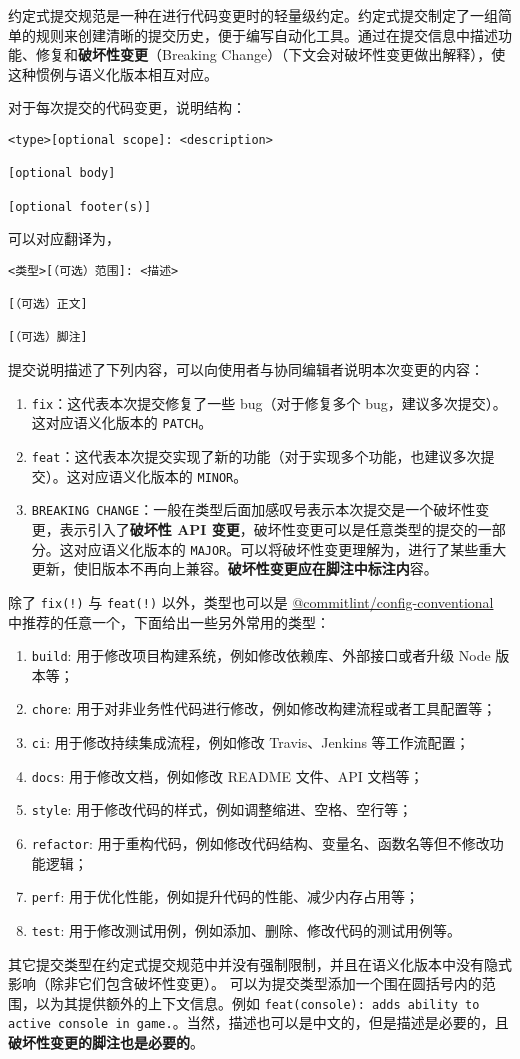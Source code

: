 
\begin{issues}
\issueDraft
\issueTODO
\end{issues}

约定式提交规范是一种在进行代码变更时的轻量级约定。约定式提交制定了一组简单的规则来创建清晰的提交历史，便于编写自动化工具。通过在提交信息中描述功能、修复和\textbf{破坏性变更}（Breaking Change）（下文会对破坏性变更做出解释），使这种惯例与语义化版本相互对应。

对于每次提交的代码变更，说明结构：
\begin{lstlisting}[language=none]
<type>[optional scope]: <description>

[optional body]

[optional footer(s)]
\end{lstlisting}
可以对应翻译为，
\begin{lstlisting}[language=none]
<类型>[（可选）范围]: <描述>

[（可选）正文]

[（可选）脚注]
\end{lstlisting}
提交说明描述了下列内容，可以向使用者与协同编辑者说明本次变更的内容：
\begin{enumerate}
\item \verb`fix`：这代表本次提交修复了一些 bug（对于修复多个 bug，建议多次提交）。这对应语义化版本的 \verb`PATCH`。
\item \verb`feat`：这代表本次提交实现了新的功能（对于实现多个功能，也建议多次提交）。这对应语义化版本的 \verb`MINOR`。
\item \verb`BREAKING CHANGE`：一般在类型后面加感叹号表示本次提交是一个破坏性变更，表示引入了\textbf{破坏性 API 变更}，破坏性变更可以是任意类型的提交的一部分。这对应语义化版本的 \verb`MAJOR`。可以将破坏性变更理解为，进行了某些重大更新，使旧版本不再向上兼容。\textbf{破坏性变更应在脚注中标注内}容。
\end{enumerate}
除了 \verb`fix(!)` 与 \verb`feat(!)` 以外，类型也可以是 \href{https://github.com/conventional-changelog/commitlint/tree/master/\%2540commitlint/config-conventional}{@commitlint/config-conventional} 中推荐的任意一个，下面给出一些另外常用的类型：
\begin{enumerate}
\item \verb`build`: 用于修改项目构建系统，例如修改依赖库、外部接口或者升级 Node 版本等；
\item \verb`chore`: 用于对非业务性代码进行修改，例如修改构建流程或者工具配置等；
\item \verb`ci`: 用于修改持续集成流程，例如修改 Travis、Jenkins 等工作流配置；
\item \verb`docs`: 用于修改文档，例如修改 README 文件、API 文档等；
\item \verb`style`: 用于修改代码的样式，例如调整缩进、空格、空行等；
\item \verb`refactor`: 用于重构代码，例如修改代码结构、变量名、函数名等但不修改功能逻辑；
\item \verb`perf`: 用于优化性能，例如提升代码的性能、减少内存占用等；
\item \verb`test`: 用于修改测试用例，例如添加、删除、修改代码的测试用例等。
\end{enumerate}
其它提交类型在约定式提交规范中并没有强制限制，并且在语义化版本中没有隐式影响（除非它们包含破坏性变更）。 可以为提交类型添加一个围在圆括号内的范围，以为其提供额外的上下文信息。例如 \verb`feat(console): adds ability to active console in game.`。当然，描述也可以是中文的，但是描述是必要的，且\textbf{破坏性变更的脚注也是必要的}。
